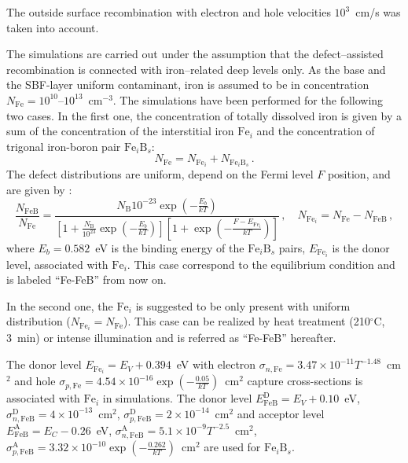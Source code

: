 \documentclass[a4paper,fleqn]{cas-sc}
\begin{document}
The outside surface recombination with electron and hole velocities $10^3$~cm/s was taken into account.

The simulations are carried out under the assumption that the defect--assisted recombination is connected with iron--related deep levels only.
As the base and the SBF-layer uniform contaminant, iron is assumed to be in concentration
$N_{\mathrm{Fe}}=10^{10}$--$10^{13}$~cm$^{-3}$.
The simulations have been performed for the following two cases.
In the first one, the concentration of totally dissolved iron is given by a sum of
the concentration of the interstitial iron $\mathrm{Fe}_i$
and the concentration of trigonal iron-boron pair $\mathrm{Fe}_i\mathrm{B}_s$:
\begin{equation}\label{eqNFeB}
  N_{\mathrm{Fe}}=N_{\mathrm{Fe}_i}+N_{\mathrm{Fe}_i\mathrm{B}_s}\,.
\end{equation}
The defect distributions are uniform, depend on the Fermi level $F$ position, and are given by
\citep{MurphyJAP2011,FeB:kinetic}:
\begin{equation}
\label{eqNFeB}
    \frac{N_{\mathrm{FeB}}}{N_{\mathrm{Fe}}}=\frac{N_\mathrm{B}10^{-23}\exp\left(-\frac{E_b}{kT}\right)}
     {\left[1+\frac{N_\mathrm{B}}{10^{23}}\exp\left(-\frac{E_b}{kT}\right)\right]\left[1+\exp\left(-\frac{F-E_{\mathrm{Fe}_i}}{kT}\right)\right]}\,,
     \quad N_{\mathrm{Fe}_i}=N_{\mathrm{Fe}}-N_{\mathrm{FeB}}\,,
\end{equation}
where
$E_b=0.582$~eV is the binding energy of the $\mathrm{Fe}_i\mathrm{B}_s$ pairs,
$E_{\mathrm{Fe}_i}$ is the donor level, associated with $\mathrm{Fe}_i$.
This case correspond to the equilibrium condition and is labeled ``Fe-FeB'' from now on.

In the second one, the $\mathrm{Fe}_i$ is suggested to be only present with uniform distribution ($N_{\mathrm{Fe}_i}=N_{\mathrm{Fe}}$).
This case can be realized by heat treatment (210$^\circ$C, 3~min) \cite{FeB_Zong} or intense illumination \cite{FeBLight2} and is referred as ``Fe-FeB'' hereafter.


The donor level $E_{\mathrm{Fe}_i} = E_V+0.394$~eV
with electron $\sigma_{n,{\mathrm{Fe}}}=3.47\times10^{-11}T^{-1.48}$~cm$^2$ and
hole $\sigma_{p,{\mathrm{Fe}}}=4.54\times10^{-16}\exp\left(-\frac{0.05}{kT}\right)$~cm$^2$ capture cross-sections \cite{MurphyJAP2011,ROUGIEUX2018}
is associated with $\mathrm{Fe}_i$ in simulations.
The donor level $E_{\mathrm{FeB}}^\mathrm{D}= E_V+0.10$~eV,
$\sigma_{n,{\mathrm{FeB}}}^\mathrm{D}=4\times10^{-13}$~cm$^2$,
$\sigma_{p,{\mathrm{FeB}}}^\mathrm{D}=2\times10^{-14}$~cm$^2$
and acceptor level $E_{\mathrm{FeB}}^\mathrm{A}= E_C-0.26$~eV,
$\sigma_{n,{\mathrm{FeB}}}^\mathrm{A}=5.1\times10^{-9}T^{-2.5}$~cm$^2$,
$\sigma_{p,{\mathrm{FeB}}}^\mathrm{A}=3.32\times10^{-10}\exp\left(-\frac{0.262}{kT}\right)$~cm$^2$
\cite{Istratov1999,MurphyJAP2011,ROUGIEUX2018}
are used for $\mathrm{Fe}_i\mathrm{B}_s$.
\end{document}
